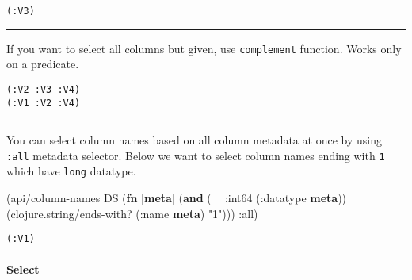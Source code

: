 \documentclass[]{article}
\newenvironment{Shaded}{\begin{snugshade}}{\end{snugshade}}
\newcommand{\KeywordTok}[1]{\textcolor[rgb]{0.13,0.29,0.53}{\textbf{#1}}}
\newcommand{\StringTok}[1]{\textcolor[rgb]{0.31,0.60,0.02}{#1}}
\newcommand{\VariableTok}[1]{\textcolor[rgb]{0.00,0.00,0.00}{#1}}
\newcommand{\AttributeTok}[1]{\textcolor[rgb]{0.77,0.63,0.00}{#1}}
\newcommand{\NormalTok}[1]{#1}
\let\oldparagraph\paragraph
\renewcommand{\paragraph}[1]{\oldparagraph{#1}\mbox{}}
\begin{document}
\begin{verbatim}
(:V3)
\end{verbatim}

\begin{center}\rule{0.5\linewidth}{0.5pt}\end{center}

If you want to select all columns but given, use \texttt{complement}
function. Works only on a predicate.

\begin{Shaded}
\end{Shaded}

\begin{verbatim}
(:V2 :V3 :V4)
(:V1 :V2 :V4)
\end{verbatim}

\begin{center}\rule{0.5\linewidth}{0.5pt}\end{center}

You can select column names based on all column metadata at once by
using \texttt{:all} metadata selector. Below we want to select column
names ending with \texttt{1} which have \texttt{long} datatype.

\begin{Shaded}
\begin{Highlighting}[]
\NormalTok{(api/column-names DS (}\KeywordTok{fn}\NormalTok{ [}\KeywordTok{meta}\NormalTok{]}
\NormalTok{                       (}\KeywordTok{and}\NormalTok{ (}\KeywordTok{=} \AttributeTok{:int64}\NormalTok{ (}\AttributeTok{:datatype} \KeywordTok{meta}\NormalTok{))}
\NormalTok{                            (clojure.string/ends-with? (}\AttributeTok{:name} \KeywordTok{meta}\NormalTok{) }\StringTok{"1"}\NormalTok{))) }\AttributeTok{:all}\NormalTok{)}
\end{Highlighting}
\end{Shaded}

\begin{verbatim}
(:V1)
\end{verbatim}

\paragraph{Select}\label{select}
\end{document}
